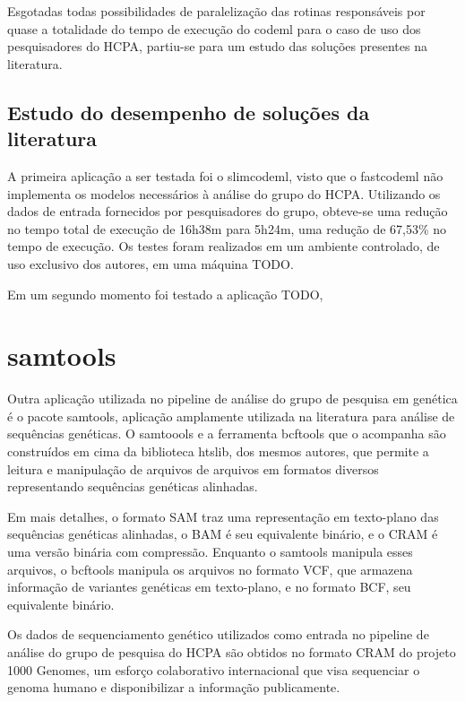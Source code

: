 \documentclass[cic,tc]{iiufrgs}
\begin{document}
Esgotadas todas possibilidades de paralelização das rotinas responsáveis por
quase a totalidade do tempo de execução do codeml para o caso de uso dos
pesquisadores do HCPA, partiu-se para um estudo das soluções presentes na
literatura.

\subsection{Estudo do desempenho de soluções da literatura}

A primeira aplicação a ser testada foi o
slimcodeml,\cite{schabauer2012slimcodeml} visto que o
fastcodeml\cite{valle2014optimization} não implementa os modelos necessários à
análise do grupo do HCPA. Utilizando os dados de entrada fornecidos por
pesquisadores do grupo, obteve-se uma redução no tempo total de execução de
16h38m para 5h24m, uma redução de 67,53\% no tempo de execução. Os testes foram
realizados em um ambiente controlado, de uso exclusivo dos autores, em uma
máquina TODO.

Em um segundo momento foi testado a aplicação TODO,\cite{maldonado2016lmap}

\section{samtools}

Outra aplicação utilizada no pipeline de análise do grupo de pesquisa em
genética é o pacote samtools,\cite{li2009sequence} aplicação amplamente
utilizada na literatura para análise de sequências
genéticas.\cite{danecek2021twelve} O samtoools e a ferramenta bcftools que o
acompanha são construídos em cima da biblioteca htslib, dos mesmos autores, que
permite a leitura e manipulação de arquivos de arquivos em formatos diversos
representando sequências genéticas alinhadas.\cite{danecek2021twelve}

Em mais detalhes, o formato SAM traz uma representação em texto-plano das
sequências genéticas alinhadas, o BAM é seu equivalente binário, e o CRAM é uma
versão binária com compressão. Enquanto o samtools manipula esses arquivos, o
bcftools manipula os arquivos no formato VCF, que armazena informação de
variantes genéticas em texto-plano, e no formato BCF, seu equivalente
binário.\cite{danecek2021twelve}

Os dados de sequenciamento genético utilizados como entrada no pipeline de
análise do grupo de pesquisa do HCPA são obtidos no formato CRAM do projeto
1000 Genomes, um esforço colaborativo internacional que visa sequenciar o
genoma humano e disponibilizar a informação publicamente.\cite{via20101000}
\end{document}
